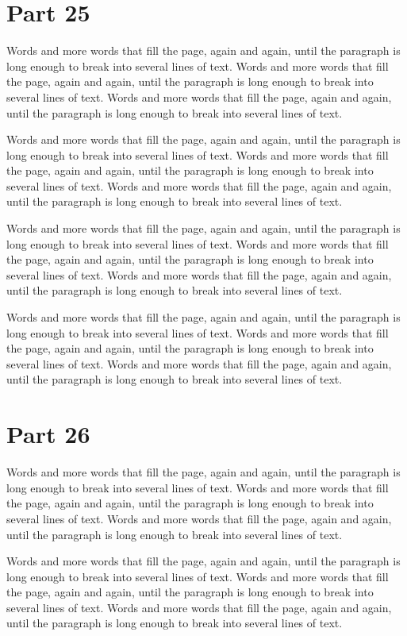 \documentclass{article}
\begin{document}
\section{Part 25}
Words and more words that fill the page, again and again, until the paragraph is long enough to break into several lines of text. Words and more words that fill the page, again and again, until the paragraph is long enough to break into several lines of text. Words and more words that fill the page, again and again, until the paragraph is long enough to break into several lines of text. 

Words and more words that fill the page, again and again, until the paragraph is long enough to break into several lines of text. Words and more words that fill the page, again and again, until the paragraph is long enough to break into several lines of text. Words and more words that fill the page, again and again, until the paragraph is long enough to break into several lines of text. 

Words and more words that fill the page, again and again, until the paragraph is long enough to break into several lines of text. Words and more words that fill the page, again and again, until the paragraph is long enough to break into several lines of text. Words and more words that fill the page, again and again, until the paragraph is long enough to break into several lines of text. 

Words and more words that fill the page, again and again, until the paragraph is long enough to break into several lines of text. Words and more words that fill the page, again and again, until the paragraph is long enough to break into several lines of text. Words and more words that fill the page, again and again, until the paragraph is long enough to break into several lines of text. 

\section{Part 26}
Words and more words that fill the page, again and again, until the paragraph is long enough to break into several lines of text. Words and more words that fill the page, again and again, until the paragraph is long enough to break into several lines of text. Words and more words that fill the page, again and again, until the paragraph is long enough to break into several lines of text. 

Words and more words that fill the page, again and again, until the paragraph is long enough to break into several lines of text. Words and more words that fill the page, again and again, until the paragraph is long enough to break into several lines of text. Words and more words that fill the page, again and again, until the paragraph is long enough to break into several lines of text. 
\end{document}
